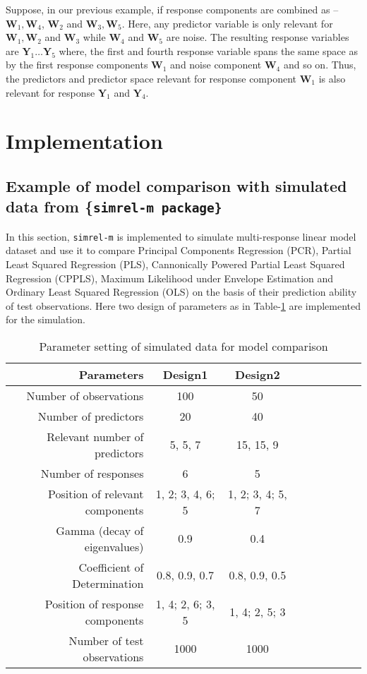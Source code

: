 \documentclass[12pt,a4paperpaper,authoryear]{elsarticle} %
\begin{document}
Suppose, in our previous example, if response components are combined as
-- \(\mathbf{W}_1, \mathbf{W}_4\), \(\mathbf{W}_2\) and
\(\mathbf{W}_3, \mathbf{W}_5\). Here, any predictor variable is only
relevant for \(\mathbf{W}_1, \mathbf{W}_2\) and \(\mathbf{W}_3\) while
\(\mathbf{W}_4\) and \(\mathbf{W}_5\) are noise. The resulting response
variables are \(\mathbf{Y}_1 \ldots \mathbf{Y}_5\) where, the first and
fourth response variable spans the same space as by the first response
components \(\mathbf{W}_1\) and noise component \(\mathbf{W}_4\) and so
on. Thus, the predictors and predictor space relevant for response
component \(\mathbf{W}_1\) is also relevant for response
\(\mathbf{Y}_1\) and \(\mathbf{Y}_4\).

\section{Implementation}\label{implementation}

\subsection{\texorpdfstring{Example of model comparison with simulated
data from \{\tt simrel-m
package\}}{Example of model comparison with simulated data from \{simrel-m package\}}}\label{example}

In this section, \texttt{simrel-m} is implemented to simulate
multi-response linear model dataset and use it to compare Principal
Components Regression (PCR), Partial Least Squared Regression (PLS),
Cannonically Powered Partial Least Squared Regression (CPPLS), Maximum
Likelihood under Envelope Estimation and Ordinary Least Squared
Regression (OLS) on the basis of their prediction ability of test
observations. Here two design of parameters as in
Table-\ref{tab:parameter-settings} are implemented for the simulation.

\begin{table}

\caption{\label{tab:parameter-settings}Parameter setting of simulated data for model comparison}
\centering
\begin{tabular}[t]{rccrccrcc}
\toprule
Parameters & Design1 & Design2\\
\midrule
Number of observations & 100 & 50\\
Number of predictors & 20 & 40\\
Relevant number of predictors & 5, 5, 7 & 15, 15, 9\\
Number of responses & 6 & 5\\
Position of relevant components & 1, 2; 3, 4, 6; 5 & 1, 2; 3, 4; 5, 7\\
\addlinespace
Gamma (decay of eigenvalues) & 0.9 & 0.4\\
Coefficient of Determination & 0.8, 0.9, 0.7 & 0.8, 0.9, 0.5\\
Position of response components & 1, 4; 2, 6; 3, 5 & 1, 4; 2, 5; 3\\
Number of test observations & 1000 & 1000\\
\bottomrule
\end{tabular}
\end{table}
\end{document}
